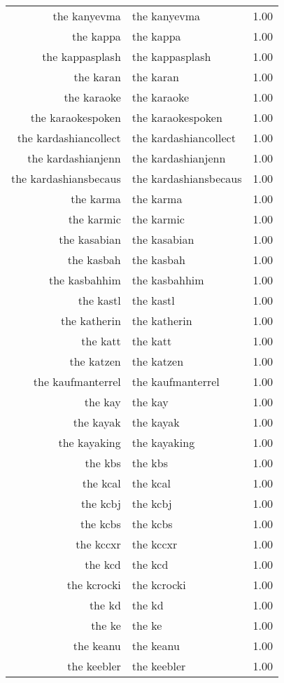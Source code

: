 \begin{table}[ht]
\begin{tabular}{rlr}
  the kanyevma & the kanyevma & 1.00 \\ 
  the kappa & the kappa & 1.00 \\ 
  the kappasplash & the kappasplash & 1.00 \\ 
  the karan & the karan & 1.00 \\ 
  the karaoke & the karaoke & 1.00 \\ 
  the karaokespoken & the karaokespoken & 1.00 \\ 
  the kardashiancollect & the kardashiancollect & 1.00 \\ 
  the kardashianjenn & the kardashianjenn & 1.00 \\ 
  the kardashiansbecaus & the kardashiansbecaus & 1.00 \\ 
  the karma & the karma & 1.00 \\ 
  the karmic & the karmic & 1.00 \\ 
  the kasabian & the kasabian & 1.00 \\ 
  the kasbah & the kasbah & 1.00 \\ 
  the kasbahhim & the kasbahhim & 1.00 \\ 
  the kastl & the kastl & 1.00 \\ 
  the katherin & the katherin & 1.00 \\ 
  the katt & the katt & 1.00 \\ 
  the katzen & the katzen & 1.00 \\ 
  the kaufmanterrel & the kaufmanterrel & 1.00 \\ 
  the kay & the kay & 1.00 \\ 
  the kayak & the kayak & 1.00 \\ 
  the kayaking & the kayaking & 1.00 \\ 
  the kbs & the kbs & 1.00 \\ 
  the kcal & the kcal & 1.00 \\ 
  the kcbj & the kcbj & 1.00 \\ 
  the kcbs & the kcbs & 1.00 \\ 
  the kccxr & the kccxr & 1.00 \\ 
  the kcd & the kcd & 1.00 \\ 
  the kcrocki & the kcrocki & 1.00 \\ 
  the kd & the kd & 1.00 \\ 
  the ke & the ke & 1.00 \\ 
  the keanu & the keanu & 1.00 \\ 
  the keebler & the keebler & 1.00 \\ 

\end{tabular}
\end{table}

